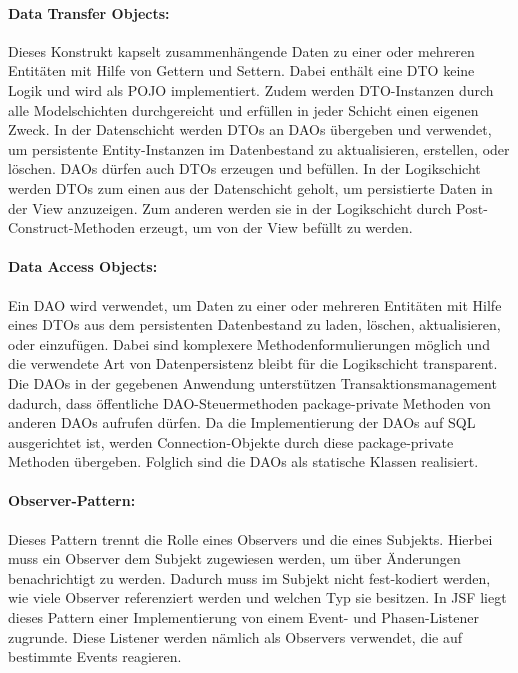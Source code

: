 \documentclass{article}
\begin{document}
\paragraph{Data Transfer Objects:}
Dieses Konstrukt kapselt zusammenhängende Daten zu einer oder mehreren Entitäten mit Hilfe von Gettern und Settern. Dabei enthält eine DTO keine Logik und wird als POJO implementiert.
Zudem werden DTO-Instanzen durch alle Modelschichten durchgereicht und erfüllen in jeder Schicht einen eigenen Zweck.
In der Datenschicht werden DTOs an DAOs übergeben und verwendet, um persistente Entity-Instanzen im Datenbestand zu aktualisieren, erstellen, oder löschen. DAOs dürfen auch DTOs erzeugen und befüllen.
In der Logikschicht werden DTOs zum einen aus der Datenschicht geholt, um persistierte Daten in der View anzuzeigen. Zum anderen werden sie in der Logikschicht durch Post-Construct-Methoden erzeugt, um von der View befüllt zu werden.

\paragraph{Data Access Objects:}
Ein DAO wird verwendet, um Daten zu einer oder mehreren Entitäten mit Hilfe eines DTOs aus dem persistenten Datenbestand zu laden, löschen, aktualisieren, oder einzufügen.
Dabei sind komplexere Methodenformulierungen möglich und die verwendete Art von Datenpersistenz bleibt für die Logikschicht transparent.
Die DAOs in der gegebenen Anwendung unterstützen Transaktionsmanagement dadurch, dass öffentliche DAO-Steuermethoden package-private Methoden von anderen DAOs aufrufen dürfen.
Da die Implementierung der DAOs auf SQL ausgerichtet ist, werden Connection-Objekte durch diese package-private Methoden übergeben. Folglich sind die DAOs als statische Klassen realisiert.

\paragraph{Observer-Pattern:}
Dieses Pattern trennt die Rolle eines Observers und die eines Subjekts. Hierbei muss ein Observer dem Subjekt zugewiesen werden, um über Änderungen benachrichtigt zu werden.
Dadurch muss im Subjekt nicht fest-kodiert werden, wie viele Observer referenziert werden und welchen Typ sie besitzen.
In JSF liegt dieses Pattern einer Implementierung von einem Event- und Phasen-Listener zugrunde. Diese Listener werden nämlich als Observers verwendet, die auf bestimmte Events reagieren.
\end{document}
